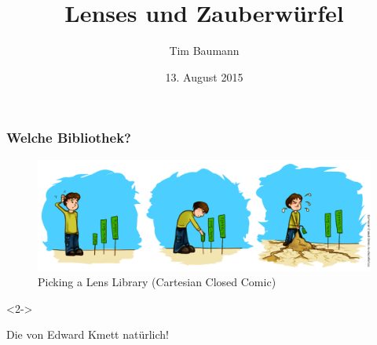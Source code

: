 \documentclass{beamer}
\title[Lens]{Lenses und Zauberwürfel}
\author{Tim Baumann}
\institute[CCA]{Curry Club Augsburg}
\date{13. August 2015}
\begin{document}
\begin{frame}
  \titlepage
\end{frame}

\begin{frame}[fragile,t]
  \frametitle{Welche Bibliothek?}
  \begin{figure}
    \includegraphics[width=0.9\linewidth]{ccc-picking-lens-library.png}
    \caption{Picking a Lens Library (Cartesian Closed Comic)}
  \end{figure}
  \begin{visibleenv}<2->
    \begin{center}
      \begin{minipage}{0.65\textwidth}
        Die von Edward Kmett natürlich! %

         \\
         \\
         \\
         \\
      \end{minipage}
    \end{center}
  \end{visibleenv}
\end{frame}
\end{document}
